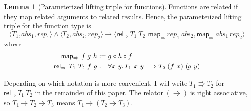 \documentclass[]{article}
\theoremstyle{definition}
\newtheorem{lemma}[theorem]{Lemma}
\newcommand{\mapfun}{\mathsf{map_\Rightarrow}}
\newcommand{\relfun}{\mathsf{rel_\Rightarrow}}
\begin{document}
\begin{lemma}[Parameterized lifting triple for functions]\label{fun-lifing-triple}
	Functions are related if they map related arguments to related results. Hence, the parameterized lifting triple for the function type is
	\begin{equation*}
		\langle T_1, abs_1, rep_1 \rangle \land \langle T_2, abs_2, rep_2 \rangle \longrightarrow \langle \relfun\ T_1\ T_2, \mapfun\ rep_1\ abs_2 , \mapfun\ abs_1\ rep_2 \rangle
	\end{equation*}
 	where
	\begin{align*}
		\mapfun\ f\ g\ h &:= g \circ h \circ f \\
		\relfun\ T_1\ T_2\ f\ g &:= \forall x\ y\ldotp T_1\ x\ y \longrightarrow T_2\ (f\ x)\ (g\ y)
	\end{align*}

	Depending on which notation is more convenient, I will write \(T_1 \Rrightarrow T_2\) for \(\relfun\ T_1\ T_2\) in the remainder of this paper. The relator \((\Rrightarrow)\) is right associative, so \(T_1 \Rrightarrow T_2 \Rrightarrow T_3\) means \(T_1 \Rrightarrow (T_2 \Rrightarrow T_3)\).
\end{lemma}
\end{document}
